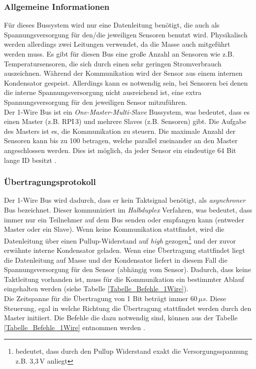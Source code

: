 \subsubsection*{Allgemeine Informationen}
\label{subsection_Allgemeine_Informationen_1Wire}
 Für dieses Bussystem wird nur eine Datenleitung benötigt, die auch als Spannungsversorgung für den\;/\;die jeweiligen Sensoren benutzt wird. Physikalisch werden allerdings zwei Leitungen verwendet, da die Masse auch mitgeführt werden muss. Es gibt für diesen Bus eine große Anzahl an Sensoren wie z.B. Temperatursensoren, die sich durch einen sehr geringen Stromverbrauch auszeichnen. Während der Kommunikation wird der Sensor aus einem internen Kondensator gespeist. Allerdings kann es notwendig sein, bei Sensoren bei denen die interne Spannungsversorgung nicht ausreichend ist, eine extra Spannungsversorgung für den jeweiligen Sensor mitzuführen. \\
Der 1-Wire Bus ist ein \textit{One-Master-Multi-Slave} Bussystem, was bedeutet, dass es  einen Master (z.B. \ac{RPI}\,3) und mehrere Slaves (z.B. Sensoren) gibt. Die Aufgabe des Masters  ist es, die Kommunikation zu steuern. Die maximale Anzahl der Sensoren kann bis zu 100 betragen, welche parallel zueinander an den Master angeschlossen werden. Dies ist möglich, da jeder Sensor ein eindeutige 64 Bit lange ID besitzt \citep{Bussysteme_in_der_Praxis}.


\subsubsection*{Übertragungsprotokoll}
\label{subsection_Protokoll_1Wire}
Der 1-Wire Bus wird dadurch, dass er kein Taktsignal benötigt, als \textit{asynchroner} Bus bezeichnet. Dieser kommuniziert im \textit{Halbduplex} Verfahren, was bedeutet, dass immer nur ein Teilnehmer auf dem Bus senden oder empfangen kann (entweder Master oder ein Slave). Wenn keine Kommunikation stattfindet, wird die Datenleitung über einen Pullup-Widerstand auf \textit{high} gezogen\footnote{bedeutet, dass durch den Pullup Widerstand exakt die Versorgungsspannung z.B. 3,3\,V anliegt} und der zuvor erwähnte interne Kondensator geladen.  Wenn eine Übertragung stattfindet liegt die Datenleitung auf Masse und der Kondensator liefert in diesem Fall die Spannungsversorgung für den Sensor (abhängig vom Sensor). Dadurch, dass keine Taktleitung vorhanden ist, muss für die Kommunikation ein bestimmter Ablauf eingehalten werden (siehe Tabelle \ref{Tabelle_Befehle_1Wire}).\\
Die Zeitspanne für die Übertragung von 1 Bit beträgt immer 60\,$\mu s$. Diese Steuerung, egal in welche Richtung die Übertragung stattfindet werden durch den Master initiiert. Die Befehle die dazu notwendig sind, können aus der Tabelle \ref{Tabelle_Befehle_1Wire} entnommen werden \citep{Bussysteme_in_der_Praxis}.


